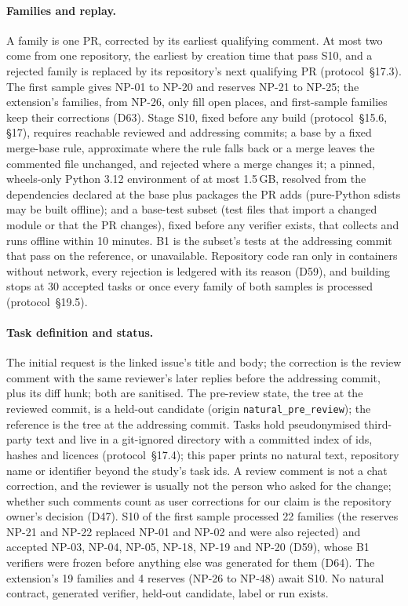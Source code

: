 \paragraph{Families and replay.} A family is one PR, corrected by its earliest qualifying comment. At most two come from one repository, the earliest by creation time that pass S10, and a rejected family is replaced by its repository's next qualifying PR (protocol~\S17.3). The first sample gives NP-01 to NP-20 and reserves NP-21 to NP-25; the extension's families, from NP-26, only fill open places, and first-sample families keep their corrections (D63). Stage S10, fixed before any build (protocol~\S15.6, \S17), requires reachable reviewed and addressing commits; a base by a fixed merge-base rule, approximate where the rule falls back or a merge leaves the commented file unchanged, and rejected where a merge changes it; a pinned, wheels-only Python 3.12 environment of at most 1.5\,GB, resolved from the dependencies declared at the base plus packages the PR adds (pure-Python sdists may be built offline); and a base-test subset (test files that import a changed module or that the PR changes), fixed before any verifier exists, that collects and runs offline within 10 minutes. B1 is the subset's tests at the addressing commit that pass on the reference, or unavailable. Repository code ran only in containers without network, every rejection is ledgered with its reason (D59), and building stops at 30 accepted tasks or once every family of both samples is processed (protocol~\S19.5).

\paragraph{Task definition and status.} The initial request is the linked issue's title and body; the correction is the review comment with the same reviewer's later replies before the addressing commit, plus its diff hunk; both are sanitised. The pre-review state, the tree at the reviewed commit, is a held-out candidate (origin \texttt{natural\_pre\_review}); the reference is the tree at the addressing commit. Tasks hold pseudonymised third-party text and live in a git-ignored directory with a committed index of ids, hashes and licences (protocol~\S17.4); this paper prints no natural text, repository name or identifier beyond the study's task ids. A review comment is not a chat correction, and the reviewer is usually not the person who asked for the change; whether such comments count as user corrections for our claim is the repository owner's decision (D47). S10 of the first sample processed 22 families (the reserves NP-21 and NP-22 replaced NP-01 and NP-02 and were also rejected) and accepted NP-03, NP-04, NP-05, NP-18, NP-19 and NP-20 (D59), whose B1 verifiers were frozen before anything else was generated for them (D64). The extension's 19 families and 4 reserves (NP-26 to NP-48) await S10. No natural contract, generated verifier, held-out candidate, label or run exists.

